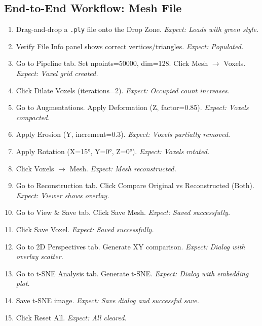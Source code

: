 \documentclass[12pt,a4paper]{article}
\begin{document}
\subsection{End-to-End Workflow: Mesh File}
\begin{enumerate}[leftmargin=1.5em]
  \item Drag-and-drop a \texttt{.ply} file onto the Drop Zone. \hfill\textit{Expect: Loads with green style.}
  \item Verify File Info panel shows correct vertices/triangles. \hfill\textit{Expect: Populated.}
  \item Go to Pipeline tab. Set npoints=50000, dim=128. Click Mesh $\rightarrow$ Voxels. \hfill\textit{Expect: Voxel grid created.}
  \item Click Dilate Voxels (iterations=2). \hfill\textit{Expect: Occupied count increases.}
  \item Go to Augmentations. Apply Deformation (Z, factor=0.85). \hfill\textit{Expect: Voxels compacted.}
  \item Apply Erosion (Y, increment=0.3). \hfill\textit{Expect: Voxels partially removed.}
  \item Apply Rotation (X=15°, Y=0°, Z=0°). \hfill\textit{Expect: Voxels rotated.}
  \item Click Voxels $\rightarrow$ Mesh. \hfill\textit{Expect: Mesh reconstructed.}
  \item Go to Reconstruction tab. Click Compare Original vs Reconstructed (Both). \hfill\textit{Expect: Viewer shows overlay.}
  \item Go to View \& Save tab. Click Save Mesh. \hfill\textit{Expect: Saved successfully.}
  \item Click Save Voxel. \hfill\textit{Expect: Saved successfully.}
  \item Go to 2D Perspectives tab. Generate XY comparison. \hfill\textit{Expect: Dialog with overlay scatter.}
  \item Go to t-SNE Analysis tab. Generate t-SNE. \hfill\textit{Expect: Dialog with embedding plot.}
  \item Save t-SNE image. \hfill\textit{Expect: Save dialog and successful save.}
  \item Click Reset All. \hfill\textit{Expect: All cleared.}
\end{enumerate}
\end{document}
